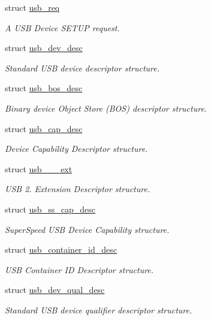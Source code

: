 \begin{DoxyCompactItemize}
\item 
struct \hyperlink{structusb__req}{usb\+\_\+req}
\begin{DoxyCompactList}\small\item\em A U\+SB Device S\+E\+T\+UP request. \end{DoxyCompactList}\item 
struct \hyperlink{structusb__dev__desc}{usb\+\_\+dev\+\_\+desc}
\begin{DoxyCompactList}\small\item\em Standard U\+SB device descriptor structure. \end{DoxyCompactList}\item 
struct \hyperlink{structusb__bos__desc}{usb\+\_\+bos\+\_\+desc}
\begin{DoxyCompactList}\small\item\em Binary device Object Store (B\+OS) descriptor structure. \end{DoxyCompactList}\item 
struct \hyperlink{structusb__cap__desc}{usb\+\_\+cap\+\_\+desc}
\begin{DoxyCompactList}\small\item\em Device Capability Descriptor structure. \end{DoxyCompactList}\item 
struct \hyperlink{structusb__2__0__ext}{usb\+\_\+\_\+\_\+ext}
\begin{DoxyCompactList}\small\item\em U\+SB 2. Extension Descriptor structure. \end{DoxyCompactList}\item 
struct \hyperlink{structusb__ss__cap__desc}{usb\+\_\+ss\+\_\+cap\+\_\+desc}
\begin{DoxyCompactList}\small\item\em Super\+Speed U\+SB Device Capability structure. \end{DoxyCompactList}\item 
struct \hyperlink{structusb__container__id__desc}{usb\+\_\+container\+\_\+id\+\_\+desc}
\begin{DoxyCompactList}\small\item\em U\+SB Container ID Descriptor structure. \end{DoxyCompactList}\item 
struct \hyperlink{structusb__dev__qual__desc}{usb\+\_\+dev\+\_\+qual\+\_\+desc}
\begin{DoxyCompactList}\small\item\em Standard U\+SB device qualifier descriptor structure. \end{DoxyCompactList}\item 

\end{DoxyCompactItemize}
